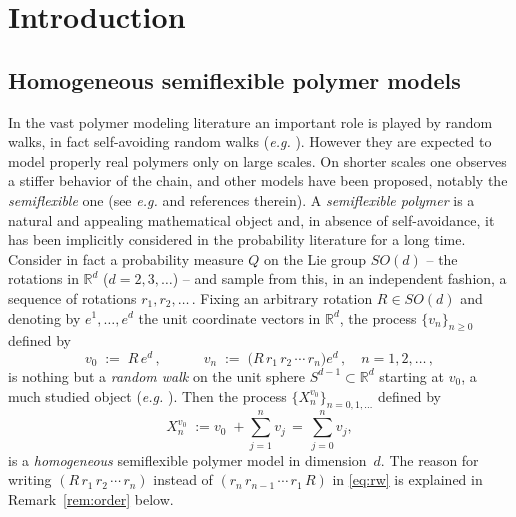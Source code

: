 \documentclass[a4paper,reqno,11pt]{amsart}
\numberwithin{equation}{section}
\newcommand{\R}{\mathbb{R}}
\begin{document}
\section{Introduction}

\subsection{Homogeneous semiflexible polymer models}
In the vast polymer modeling literature an important role is played
by random walks, in fact self-avoiding random walks ({\sl e.g.} \cite{cf:Freed,cf:scaling}).
However they are expected to model properly real polymers
only on large scales. On shorter scales one observes a stiffer behavior
of the chain,  and other models
have been proposed, notably  the {\sl semiflexible} one (see {\sl e.g.} \cite{cf:MarkoSiggia,cf:WN}
and references therein).
A {\sl semiflexible polymer} is a natural and appealing mathematical
object and, in absence of self-avoidance,
it has been implicitly considered in the probability  literature
for a long time.
Consider in fact a probability measure $Q$ on the Lie group $SO(d)$ --
the rotations in $\R^d$ ($d=2,3,\ldots$) -- and sample from this, in an independent
fashion, a sequence of rotations $r_1, r_2, \ldots\,$.
Fixing an arbitrary rotation $R \in SO(d)$ and denoting by
$e^1, \ldots, e^d$ the unit coordinate vectors in $\R^d$,
the process $\{v_n\}_{n \ge 0}$ defined by
\begin{equation} \label{eq:rw}
v_0 \;:=\; R\, e^d \,, \qquad \quad
v_n \;:=\; \big(R\, r_1\, r_2\, \cdots \, r_n \big) e^d\,, \quad n=1, 2 , \ldots \,,
\end{equation}
is nothing but a {\sl random walk} on the unit sphere $S^{d-1} \subset \R^d$
starting at $v_0$, a much studied object ({\sl e.g.} \cite{cf:RobUrs,cf:Ros}).
Then the process $\{X_n^{v_0}\}_{n=0, 1, \ldots}$ defined by
\begin{equation}
\label{eq:Xhomogeneous}
X_n^{v_0} \; := v_0 \; + \sum_{j=1}^n v_j\, =\, \sum_{j=0}^n v_j,
\end{equation}
is a {\sl homogeneous} semiflexible polymer model in dimension~$d$.
The reason for writing $(R \, r_1\, r_2\, \cdots \, r_n)$ instead
of $(r_n\, r_{n-1}\, \cdots \, r_1 \, R)$ in \eqref{eq:rw} is explained
in Remark~\ref{rem:order} below.
\end{document}
